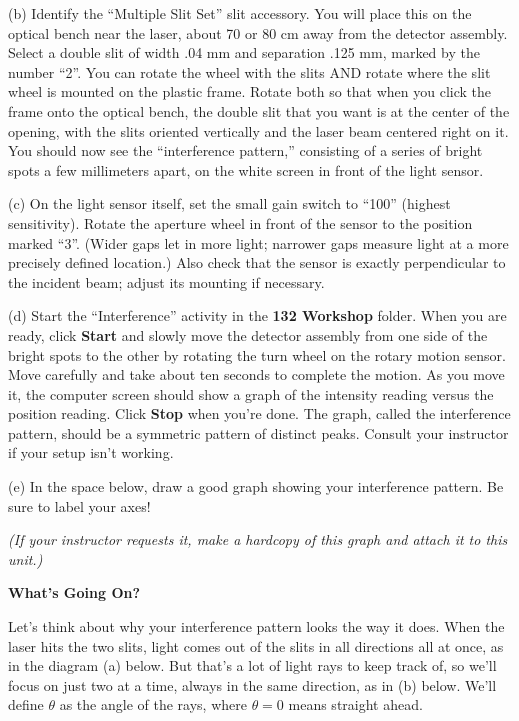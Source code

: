 
(b) Identify the ``Multiple Slit Set'' slit accessory.  You will place this on the optical bench near the laser, about 70 or 80 cm away from the detector assembly.  Select a double slit of width .04 mm and separation .125 mm, marked by the number ``2''. You can rotate the wheel with the slits AND rotate where the slit wheel is mounted on the plastic frame.  
Rotate both so that when you click the frame onto the optical bench, the double slit that you want is at the center of the opening, with the slits oriented vertically and the laser beam centered right on it.  You should now see the ``interference pattern,'' consisting of a series of bright spots a few millimeters apart, on the white screen in front of the light sensor.


(c) On the light sensor itself, set the small gain switch to ``100'' (highest sensitivity).  Rotate the aperture wheel in front of the sensor to the position marked ``3''.  (Wider gaps let in more light; narrower gaps measure light at a more precisely defined location.)  Also check that the sensor is exactly perpendicular to the incident beam; adjust its mounting if necessary.


(d) Start the ``Interference'' activity in the {\bf 132 Workshop} folder. 
When you are ready, click {\bf Start} and slowly move the detector assembly 
from one side of the bright spots to the other by rotating the turn wheel on the rotary 
motion sensor. Move carefully and take about ten seconds to complete the 
motion. 
As you move it, the computer screen should show a graph of the intensity reading versus the position reading. 
Click {\bf Stop} when you're done. 
The graph, called the interference pattern, should be a symmetric pattern of distinct peaks. Consult your instructor if your setup isn't working.

\pagebreak[2]
(e) In the space below, draw a good graph showing your interference pattern.  
Be sure to label your axes!
\answerspace{1.5in}

\textit{(If your instructor requests it, make a hardcopy of this graph and attach it to this unit.)}

\textbf{What's Going On?}

Let's think about why your interference pattern looks the way it does.  When the laser hits the two slits, 
light comes out of the slits in all directions all at once, as in the diagram (a) below.  
But that's a lot of light rays to keep track of, so we'll focus on just two at a time, always in the same direction, as in (b) below.
We'll define $\theta$ as the angle of the rays, where $\theta=0$ means straight ahead.  


